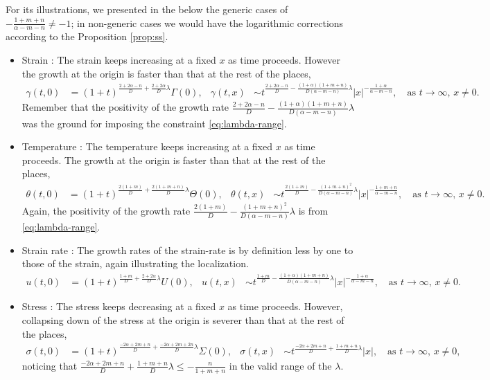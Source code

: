 \documentclass[a4paper,11pt]{article}
\theoremstyle{remark}
\begin{document}
For its illustrations, we presented in the below the generic cases of $-\frac{1+m+n}{\alpha-m-n}\ne-1$; in non-generic cases we would have the logarithmic corrections according to the Proposition \ref{prop:ss}.
\begin{itemize}
 \item Strain : The strain keeps increasing at a fixed $x$ as time proceeds. However the growth at the origin is faster than that at the rest of the places,
\begin{align*}
 \gamma(t,0) &= (1+t)^{\frac{2+2\alpha-n}{D} + \frac{2+2\alpha}{D}\lambda}\Gamma(0), &
 \gamma(t,x) &\sim t^{\frac{2+2\alpha-n}{D} - \frac{(1+\alpha)(1+m+n)}{D(\alpha-m-n)}\lambda}|x|^{-\frac{1+\alpha}{\alpha-m-n}}, \quad \text{as $t \rightarrow \infty$, $x\ne0$.}
\end{align*}
Remember that the positivity of the growth rate $\frac{2+2\alpha-n}{D} - \frac{(1+\alpha)(1+m+n)}{D(\alpha-m-n)}\lambda$ was the ground for imposing the constraint \eqref{eq:lambda-range}.
\item Temperature : The temperature keeps increasing at a fixed $x$ as time proceeds. The growth at the origin is faster than that at the rest of the places,
\begin{align*}
 \theta(t,0) &= (1+t)^{\frac{2(1+m)}{D} + \frac{2(1+m+n)}{D}\lambda}\Theta(0),&
 \theta(t,x) &\sim t^{\frac{2(1+m)}{D} - \frac{(1+m+n)^2}{D(\alpha-m-n)}\lambda}|x|^{-\frac{1+m+n}{\alpha-m-n}}, \quad \text{as $t \rightarrow \infty$, $x\ne0$.}
\end{align*}
Again, the positivity of the growth rate $\frac{2(1+m)}{D} - \frac{(1+m+n)^2}{D(\alpha-m-n)}\lambda$ is from \eqref{eq:lambda-range}.
\item Strain rate : The growth rates of the strain-rate is by definition less by one to those of the strain, again illustrating the localization.
\begin{align*}
 u(t,0) &= (1+t)^{\frac{1+m}{D} + \frac{2+2\alpha}{D}\lambda}U(0),&
 u(t,x) &\sim t^{\frac{1+m}{D} - \frac{(1+\alpha)(1+m+n)}{D(\alpha-m-n)}\lambda}|x|^{-\frac{1+\alpha}{\alpha-m-n}}, \quad \text{as $t \rightarrow \infty$, $x\ne0$.}
\end{align*}
\item Stress : The stress keeps decreasing at a fixed $x$ as time proceeds. However, collapsing down of the stress at the origin is severer than that at the rest of the places,
\begin{align*}
 \sigma(t,0) &= (1+t)^{\frac{-2\alpha+2m+n}{D} + \frac{-2\alpha+2m+2n}{D}\lambda}\Sigma(0), &
 \sigma(t,x) &\sim t^{\frac{-2\alpha+2m+n}{D} +\frac{1+m+n}{D}\lambda}|x|, \quad \text{as $t \rightarrow \infty$, $x\ne0$,}
\end{align*}
noticing that $\frac{-2\alpha+2m+n}{D} +\frac{1+m+n}{D}\lambda\le-\frac{n}{1+m+n}$ in the valid range of the $\lambda$.



\end{itemize}
\end{document}
